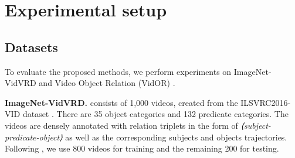 \documentclass[10pt,twocolumn,letterpaper]{article}
\begin{document}
\begin{table*}[t]
\centering
{}
\caption{\textbf{Benefit of multi-modal features} on VidOR. More is better. The increasing gaps indicate Social Fabric effectively captures multi-modal features for relation classification and detection.}
\label{tab:type}
\end{table*}

\section{Experimental setup}

\subsection{Datasets}
To evaluate the proposed methods, we perform experiments on ImageNet-VidVRD \cite{shang2017video} and Video Object Relation (VidOR) \cite{shang2019annotating}.

\textbf{ImageNet-VidVRD.} \cite{shang2017video} consists of 1,000 videos, created from the ILSVRC2016-VID dataset \cite{russakovsky2015imagenet}. There are 35 object categories and 132 predicate categories. The videos are densely annotated with relation triplets in the form of \emph{⟨subject-predicate-object⟩} as well as the corresponding subjects and objects trajectories. Following \cite{shang2017video, tsai2019video}, we use 800 videos for training and the remaining 200 for testing. 
\end{document}
